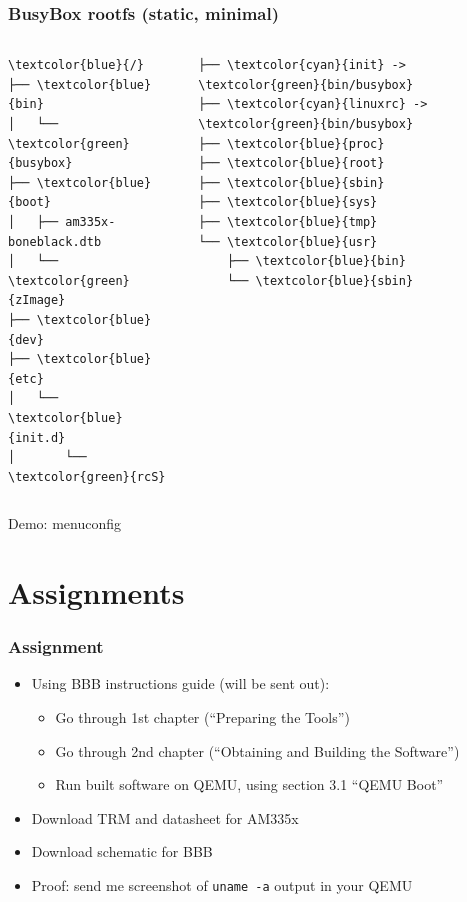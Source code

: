 \documentclass[aspectratio=169]{beamer}
\begin{document}
\begin{frame}[fragile]
  \frametitle{BusyBox rootfs (static, minimal)}
  \begin{columns}
      \begin{Verbatim}[commandchars=\\\{\}]
\textcolor{blue}{/}
├── \textcolor{blue}{bin}
│   └── \textcolor{green}{busybox}
├── \textcolor{blue}{boot}
│   ├── am335x-boneblack.dtb
│   └── \textcolor{green}{zImage}
├── \textcolor{blue}{dev}
├── \textcolor{blue}{etc}
│   └── \textcolor{blue}{init.d}
│       └── \textcolor{green}{rcS}
      \end{Verbatim}
      \begin{Verbatim}[commandchars=\\\{\}]
├── \textcolor{cyan}{init} -> \textcolor{green}{bin/busybox}
├── \textcolor{cyan}{linuxrc} -> \textcolor{green}{bin/busybox}
├── \textcolor{blue}{proc}
├── \textcolor{blue}{root}
├── \textcolor{blue}{sbin}
├── \textcolor{blue}{sys}
├── \textcolor{blue}{tmp}
└── \textcolor{blue}{usr}
    ├── \textcolor{blue}{bin}
    └── \textcolor{blue}{sbin}
      \end{Verbatim}
  \end{columns}
\end{frame}


\begin{frame}[standout]
  Demo: menuconfig
\end{frame}

\section*{Assignments}

\begin{frame}
  \frametitle{Assignment}
  \begin{itemize}
    \item Using BBB instructions guide (will be sent out):
      \begin{itemize}
        \item Go through 1st chapter (``Preparing the Tools'')
        \item Go through 2nd chapter (``Obtaining and Building the Software'')
        \item Run built software on QEMU, using section 3.1 ``QEMU Boot''
      \end{itemize}
    \item Download TRM and datasheet for AM335x
    \item Download schematic for BBB
    \item Proof: send me screenshot of \texttt{uname -a} output in your QEMU
  \end{itemize}
\end{frame}
\end{document}
